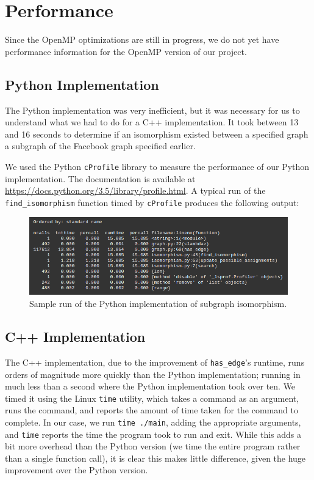 \documentclass{article}
\begin{document}
\section{Performance}

  Since the OpenMP optimizations are still in progress, we do not yet have performance information for the OpenMP version of our project.

  \subsection{Python Implementation}
  The Python implementation was very inefficient, but it was necessary for us to understand what we had to do for a C++ implementation. It took between 13 and 16 seconds to determine if an isomorphism existed between a specified graph a subgraph of the Facebook graph specified earlier.

  We used the Python \texttt{cProfile} library to measure the performance of our Python implementation. The documentation is available at \url{https://docs.python.org/3.5/library/profile.html}. A typical run of the \texttt{find\_isomorphism} function timed by \texttt{cProfile} produces the following output:

  \begin{figure}[H]
    \centering
    \includegraphics[scale=0.6]{images/perf}
    \caption{Sample run of the Python implementation of subgraph isomorphism.}
  \end{figure}

  \subsection{C++ Implementation}
  The C++ implementation, due to the improvement of \texttt{has\_edge}'s runtime, runs orders of magnitude more quickly than the Python implementation; running in much less than a second where the Python implementation took over ten. We timed it using the Linux \texttt{time} utility, which takes a command as an argument, runs the command, and reports the amount of time taken for the command to complete. In our case, we run \texttt{time ./main}, adding the appropriate arguments, and \texttt{time} reports the time the program took to run and exit. While this adds a bit more overhead than the Python version (we time the entire program rather than a single function call), it is clear this makes little difference, given the huge improvement over the Python version.
\end{document}
